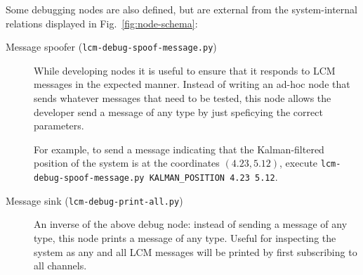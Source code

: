 Some debugging nodes are also defined, but are external from the system-internal relations displayed in Fig.~\ref{fig:node-schema}:
\begin{description}
\item[Message spoofer (\texttt{lcm-debug-spoof-message.py})]
  While developing nodes it is useful to ensure that it responds to LCM messages in the expected manner.
  Instead of writing an ad-hoc node that sends whatever messages that need to be tested,
  this node allows the developer send a message of any type by just speficying the correct parameters.


  For example, to send a message indicating that the Kalman-filtered position of the system is at the coordinates $(4.23, 5.12)$,
  execute \texttt{lcm-debug-spoof-message.py KALMAN\_POSITION 4.23 5.12}.

\item[Message sink (\texttt{lcm-debug-print-all.py})]
  An inverse of the above debug node: instead of sending a message of any type,
  this node prints a message of any type.
  Useful for inspecting the system as any and all LCM messages will be printed by first subscribing to all channels.
\end{description}